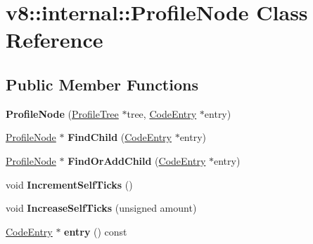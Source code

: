 \hypertarget{classv8_1_1internal_1_1_profile_node}{}\section{v8\+:\+:internal\+:\+:Profile\+Node Class Reference}
\label{classv8_1_1internal_1_1_profile_node}
\subsection*{Public Member Functions}
\begin{DoxyCompactItemize}
\item 
\hypertarget{classv8_1_1internal_1_1_profile_node_afeb26f68b37dac7e9d3102463a19b850}{}{\bfseries Profile\+Node} (\hyperlink{classv8_1_1internal_1_1_profile_tree}{Profile\+Tree} $\ast$tree, \hyperlink{classv8_1_1internal_1_1_code_entry}{Code\+Entry} $\ast$entry)\label{classv8_1_1internal_1_1_profile_node_afeb26f68b37dac7e9d3102463a19b850}

\item 
\hypertarget{classv8_1_1internal_1_1_profile_node_ac96d366da81d11a5b0df39395107c94c}{}\hyperlink{classv8_1_1internal_1_1_profile_node}{Profile\+Node} $\ast$ {\bfseries Find\+Child} (\hyperlink{classv8_1_1internal_1_1_code_entry}{Code\+Entry} $\ast$entry)\label{classv8_1_1internal_1_1_profile_node_ac96d366da81d11a5b0df39395107c94c}

\item 
\hypertarget{classv8_1_1internal_1_1_profile_node_ad497489ded1efb610de028ba9c411ea9}{}\hyperlink{classv8_1_1internal_1_1_profile_node}{Profile\+Node} $\ast$ {\bfseries Find\+Or\+Add\+Child} (\hyperlink{classv8_1_1internal_1_1_code_entry}{Code\+Entry} $\ast$entry)\label{classv8_1_1internal_1_1_profile_node_ad497489ded1efb610de028ba9c411ea9}

\item 
\hypertarget{classv8_1_1internal_1_1_profile_node_a651b8b8c09b8a8dda1acb22d41bebd09}{}void {\bfseries Increment\+Self\+Ticks} ()\label{classv8_1_1internal_1_1_profile_node_a651b8b8c09b8a8dda1acb22d41bebd09}

\item 
\hypertarget{classv8_1_1internal_1_1_profile_node_af4feb4a8fec76e8bc6d0426ae261bb0c}{}void {\bfseries Increase\+Self\+Ticks} (unsigned amount)\label{classv8_1_1internal_1_1_profile_node_af4feb4a8fec76e8bc6d0426ae261bb0c}

\item 
\hypertarget{classv8_1_1internal_1_1_profile_node_ad005fdfaa64e5363d646c80bc2d9b43f}{}\hyperlink{classv8_1_1internal_1_1_code_entry}{Code\+Entry} $\ast$ {\bfseries entry} () const \label{classv8_1_1internal_1_1_profile_node_ad005fdfaa64e5363d646c80bc2d9b43f}


\end{DoxyCompactItemize}
